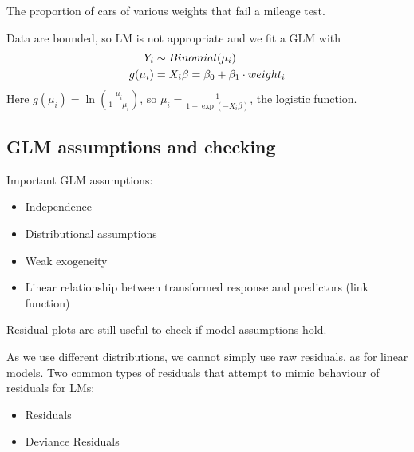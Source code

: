 \begin{example}
	The proportion of cars of various weights that fail a mileage test.
	
	\begin{center}
	\end{center}
	
	Data are bounded, so LM is not appropriate and we fit a GLM with
	\begin{align}
		Y_i &\sim Binomial(\mu_i) \notag \\
		g(\mu_i) &= X_i\beta = \beta_0 + \beta_1\cdot weight_i \notag
	\end{align}
	Here $g(\mu_i) = \ln\left(\frac{\mu_i}{1-\mu_i}\right)$, so $\mu_i=\frac{1}{1+\exp(-X_i\beta)}$, the logistic function.
\end{example}

\subsection{GLM assumptions and checking}

Important GLM assumptions:
\begin{itemize}
	\item Independence
	\item Distributional assumptions
	\item Weak exogeneity
	\item Linear relationship between transformed response and predictors (link function)
\end{itemize}
Residual plots are still useful to check if model assumptions hold.

As we use different distributions, we cannot simply use raw residuals, as for linear models. Two common types of residuals that attempt to mimic behaviour of residuals for LMs:
\begin{itemize}
	\item {} Residuals
	\item Deviance Residuals
\end{itemize}

